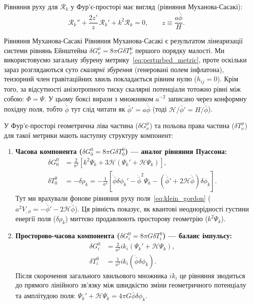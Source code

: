 Рівняння руху для $\mathcal{R}_k$ у Фур'є-просторі має вигляд \cite{mukhanov_2005} (рівняння Муханова-Сасакі):
\begin{equation}\label{eq:R_eom}
  \mathcal{R}_k'' + \frac{2z'}{z}\,\mathcal{R}_k' + k^2\mathcal{R}_k = 0, \qquad z \equiv \frac{a\dot{\bar\phi}}{H}.
\end{equation}

\begin{mathbox}{Рівняння Муханова-Сасакі}
    Рівняння Муханова-Сасакі є результатом лінеаризації системи рівнянь Ейнштейна
    $\delta G^\mu_\nu = 8\pi G \delta T^\mu_\nu$ першого порядку малості. Ми використовуємо загальну
    збурену метрику~\eqref{eq:perturbed_metric}, проте оскільки зараз розглядаються суто
    \emph{скалярні збурення} (генеровані полем інфлатона), тензорний член гравітаційних хвиль
    покладається рівним нулю ($h_{ij} = 0$). Крім того, за відсутності анізотропного тиску
    скалярні потенціали тотожно рівні між собою: $\Phi = \Psi$. У цьому боксі вирази з множником $a^{-2}$ записано через конформну похідну поля, тобто $\dot{\bar\phi}$ тут слід читати як $\bar\phi' = a\dot{\bar\phi}$ (тоді $\mathcal{H}/\bar\phi' = H/\dot{\bar\phi}$).

    У Фур'є-просторі геометрична ліва частина ($\delta G^\mu_\nu$) та польова права частина ($\delta T^\mu_\nu$)
    для такої метрики мають наступну структуру компонент:

    \begin{enumerate}
      \item \textbf{Часова компонента ($\delta G^0_0 = 8\pi G \delta T^0_0$) --- аналог рівняння Пуассона:}
      \begin{align*}
        \delta G^0_0 &= \frac{2}{a^2} \left[ k^2\Psi_k + 3\mathcal{H}(\Psi_k' + \mathcal{H}\Psi_k) \right], \\
        \delta T^0_0 &= -\delta\rho_k = - \frac{1}{a^2} \left[ \dot{\bar{\phi}}\delta\phi_k' - \dot{\bar{\phi}}^2\Psi_k - (\dot{\bar{\phi}}' + 2\mathcal{H}\dot{\bar{\phi}})\delta\phi_k \right].
      \end{align*}
      Тут ми врахували фонове рівняння руху поля~\eqref{eq:klein_gordon} ($a^2 V_{,\phi} = -\dot{\bar{\phi}}' - 2\mathcal{H}\dot{\bar{\phi}}$). Ця рівність показує, як квантові неоднорідності густини енергії поля ($\delta\rho_k$) миттєво продавлюють просторову геометрію ($k^2\Psi_k$).

      \item \textbf{Просторово-часова компонента ($\delta G^0_i = 8\pi G \delta T^0_i$) --- баланс імпульсу:}
      \begin{align*}
        \delta G^0_i &= \frac{2}{a^2} i k_i (\Psi_k' + \mathcal{H}\Psi_k), \\
        \delta T^0_i &= \frac{1}{a^2} i k_i \left( \dot{\bar{\phi}} \delta\phi_k \right).
      \end{align*}
      Після скорочення загального хвильового множника $ik_i$ це рівняння зводиться до прямого лінійного зв'язку між швидкістю зміни геометричного потенціалу та амплітудою поля: $\Psi_k' + \mathcal{H}\Psi_k = 4\pi G \dot{\bar{\phi}} \delta\phi_k$.
    \end{enumerate}


\end{mathbox}
